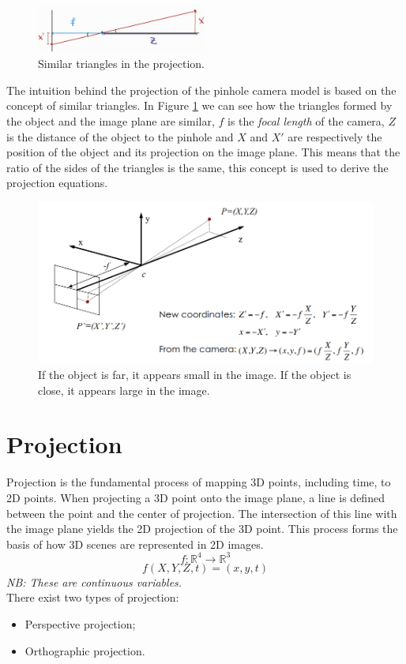 \begin{figure}[H]
    \centering
    \includegraphics[width=0.5\textwidth]{Figures/triangles.jpg}
    \caption{Similar triangles in the projection.}
    \label{fig:triangles}
\end{figure}

The intuition behind the projection of the pinhole camera model is based on the concept of similar triangles. In Figure \ref{fig:triangles} we can see how the triangles formed by the object and the image plane are similar, \(f\) is the \textit{focal length} of the camera, \(Z\) is the distance of the object to the pinhole and \(X\) and \(X'\) are respectively the position of the object and its projection on the image plane. This means that the ratio of the sides of the triangles is the same, this concept is used to derive the projection equations. 

\begin{figure}[H]
    \centering
    \includegraphics[width=1\textwidth]{Figures/Pinhole.png}
    \caption{If the object is far, it appears small in the image. If the object is close, it appears large in the image.}
\end{figure}
\section{Projection}
Projection is the fundamental process of mapping 3D points, including time, to 2D points. When projecting a 3D point onto the image plane, a line is defined between the point and the center of projection. The intersection of this line with the image plane yields the 2D projection of the 3D point. This process forms the basis of how 3D scenes are represented in 2D images.
\[
    f: \mathbb{R}^4 \rightarrow \mathbb{R}^3    
\]
\[
    f(X,Y,Z,t) = (x,y,t)
\]
\textit{NB: These are continuous variables.}       
\\
There exist two types of projection:
\begin{itemize}
    \item Perspective projection;
    \item Orthographic projection.
\end{itemize}
